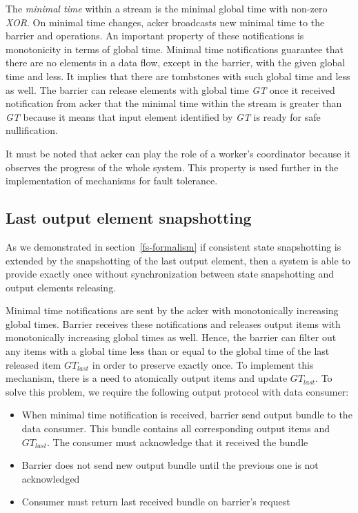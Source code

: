 The {\em minimal time} within a stream is the minimal global time with non-zero {\it XOR}. On minimal time changes, acker broadcasts new minimal time to the barrier and operations. An important property of these notifications is monotonicity in terms of global time. Minimal time notifications guarantee that there are no elements in a data flow, except in the barrier, with the given global time and less. It implies that there are tombstones with such global time and less as well. The barrier can release elements with global time {\it GT} once it received notification from acker that the minimal time within the stream is greater than {\it GT} because it means that input element identified by {\it GT} is ready for safe nullification. 

It must be noted that acker can play the role of a worker's coordinator because it observes the progress of the whole system. This property is used further in the implementation of mechanisms for fault tolerance. 

\subsection{Last output element snapshotting}

As we demonstrated in section~\ref{fs-formalism} if consistent state snapshotting is extended by the snapshotting of the last output element, then a system is able to provide exactly once without synchronization between state snapshotting and output elements releasing. 

Minimal time notifications are sent by the acker with monotonically increasing global times. Barrier receives these notifications and releases output items with monotonically increasing global times as well. Hence, the barrier can filter out any items with a global time less than or equal to the global time of the last released item $GT_{last}$ in order to preserve exactly once. To implement this mechanism, there is a need to atomically output items and update $GT_{last}$. To solve this problem, we require the following output protocol with data consumer: 

\begin{itemize}
    \item When minimal time notification is received, barrier send output bundle to the data consumer. This bundle contains all corresponding output items and $GT_{last}$. The consumer must acknowledge that it received the bundle
    \item Barrier does not send new output bundle until the previous one is not acknowledged
    \item Consumer must return last received bundle on barrier's request 
\end{itemize}

